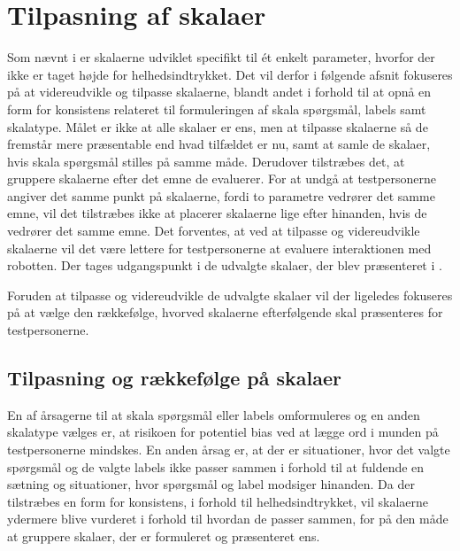 \chapter{Tilpasning af skalaer}
\label{TestAfSkalaTilpasningAfSkalaer}
%
Som nævnt i  er skalaerne udviklet specifikt til ét enkelt parameter, hvorfor der ikke er taget højde for helhedsindtrykket. Det vil derfor i følgende afsnit fokuseres på at videreudvikle og tilpasse skalaerne, blandt andet i forhold til at opnå en form for konsistens relateret til formuleringen af skala spørgsmål, labels samt skalatype. Målet er ikke at alle skalaer er ens, men at tilpasse skalaerne så de fremstår mere præsentable end hvad tilfældet er nu, samt at samle de skalaer, hvis skala spørgsmål stilles på samme måde. Derudover tilstræbes det, at gruppere skalaerne efter det emne de evaluerer. For at undgå at testpersonerne angiver det samme punkt på skalaerne, fordi to parametre vedrører det samme emne, vil det tilstræbes ikke at placerer skalaerne lige efter hinanden, hvis de vedrører det samme emne. Det forventes, at ved at tilpasse og videreudvikle skalaerne vil det være lettere for testpersonerne at evaluere interaktionen med robotten. Der tages udgangspunkt i de udvalgte skalaer, der blev præsenteret i .

Foruden at tilpasse og videreudvikle de udvalgte skalaer vil der ligeledes fokuseres på at vælge den rækkefølge, hvorved skalaerne efterfølgende skal præsenteres for testpersonerne.    
%
\section{Tilpasning og rækkefølge på skalaer}
\label{TilpasningSkalaer}
%
En af årsagerne til at skala spørgsmål eller labels omformuleres og en anden skalatype vælges er, at risikoen for potentiel bias ved at lægge ord i munden på testpersonerne mindskes. En anden årsag er, at der er situationer, hvor det valgte spørgsmål og de valgte labels ikke passer sammen i forhold til at fuldende en sætning og situationer, hvor spørgsmål og label modsiger hinanden. Da der tilstræbes en form for konsistens, i forhold til helhedsindtrykket, vil skalaerne ydermere blive vurderet i forhold til hvordan de passer sammen, for på den måde at gruppere skalaer, der er formuleret og præsenteret ens. 


